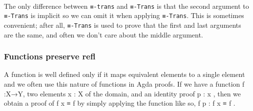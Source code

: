 \begin{code}
\AgdaSymbol{)}\AgdaSpace{}%
\AgdaSpace{}%
\AgdaSpace{}%
\AgdaSpace{}%
\AgdaSpace{}%
\AgdaSpace{}%
\AgdaSpace{}%
\AgdaSpace{}%
\AgdaSpace{}%
\AgdaSpace{}%
\AgdaSpace{}%
\AgdaSpace{}%
\<%
\\
%
\>[1]\AgdaSpace{}%
\AgdaSpace{}%
\AgdaSymbol{\{}\AgdaSymbol{\}}\AgdaSpace{}%
\AgdaSpace{}%
\AgdaSymbol{(}\AgdaSpace{}%
\AgdaSymbol{\AgdaUnderscore{})}\AgdaSpace{}%
\AgdaSymbol{(}\AgdaSpace{}%
\AgdaSymbol{\AgdaUnderscore{})}\AgdaSpace{}%
\AgdaSymbol{=}\AgdaSpace{}%
\AgdaSpace{}%
\AgdaSymbol{\AgdaUnderscore{}}\<%
\end{code}
\ccpad
The only difference between \texttt{≡-trans} and \texttt{≡-Trans} is that the second argument to \texttt{≡-Trans} is implicit so we can omit it when applying \texttt{≡-Trans}. This is sometimes convenient; after all, \texttt{≡-Trans} is used to prove that the first and last arguments are the same, and often we don't care about the middle argument.

\subsubsection{Functions preserve refl}\label{functions-preserve-refl}
A function is well defined only if it maps equivalent elements to a single element and we often use this nature of functions in Agda proofs. If we have a function \ab f \as :\ab X\as →\ab Y, two elements \ab x  \as : \ab X of the domain, and an identity proof \ab p \as : \ab x  , then we obtain a proof of \ab f \ab x \ad ≡ \ab f  by simply applying the  function like so,  \ab f \ab p \as : \ab f \ab x \ad ≡ \ab f .

